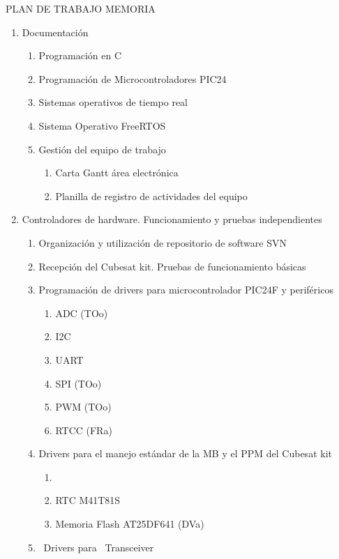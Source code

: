 \documentclass{article}
\title{}
\author{}
\date{2012-10-12}
\begin{document}
PLAN DE TRABAJO MEMORIA\newline


\begin{enumerate}
\item Documentación 

\begin{enumerate}
\item Programación en C
\item Programación de Microcontroladores PIC24
\item Sistemas operativos de tiempo real
\item Sistema Operativo FreeRTOS
\item Gestión del equipo de trabajo

\begin{enumerate}
\item Carta Gantt área electrónica
\item Planilla de registro de actividades del equipo
\end{enumerate}
\end{enumerate}
\item Controladores de hardware. Funcionamiento y pruebas independientes

\begin{enumerate}
\item Organización y utilización de repositorio de software SVN
\item Recepción del Cubesat kit. Pruebas de funcionamiento básicas
\item Programación de drivers para microcontrolador PIC24F y periféricos

\begin{enumerate}
\item ADC (TOo)
\item I2C
\item UART
\item SPI (TOo)
\item PWM (TOo)
\item RTCC (FRa)
\end{enumerate}
\item Drivers para el manejo estándar de la MB y el PPM del Cubesat kit

\begin{enumerate}
\item 
\bigskip
\item RTC M41T81S
\item Memoria Flash AT25DF641 (DVa)
\end{enumerate}
\item \ Drivers para \ Transceiver


\end{enumerate}
\end{enumerate}
\end{document}
